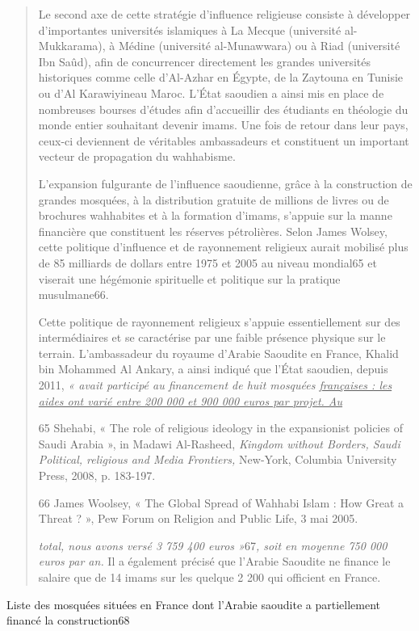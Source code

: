 \begin{quote}
Le second axe de cette stratégie d'influence religieuse consiste à
développer d'importantes universités islamiques à La Mecque (université
al-Mukkarama), à Médine (université al-Munawwara) ou à Riad (université
Ibn Saûd), afin de concurrencer directement les grandes universités
historiques comme celle d'Al-Azhar en Égypte, de la Zaytouna en Tunisie
ou d'Al Karawiyineau Maroc. L'État saoudien a ainsi mis en place de
nombreuses bourses d'études afin d'accueillir des étudiants en théologie
du monde entier souhaitant devenir imams. Une fois de retour dans leur
pays, ceux-ci deviennent de véritables ambassadeurs et constituent un
important vecteur de propagation du wahhabisme.

L'expansion fulgurante de l'influence saoudienne, grâce à la
construction de grandes mosquées, à la distribution gratuite de millions
de livres ou de brochures wahhabites et à la formation d'imams, s'appuie
sur la manne financière que constituent les réserves pétrolières. Selon
James Wolsey, cette politique d'influence et de rayonnement religieux
aurait mobilisé plus de 85 milliards de dollars entre 1975 et 2005 au
niveau mondial65 et viserait une hégémonie spirituelle et politique sur
la pratique musulmane66.

Cette politique de rayonnement religieux s'appuie essentiellement sur
des intermédiaires et se caractérise par une faible présence physique
sur le terrain. L'ambassadeur du royaume d'Arabie Saoudite en France,
Khalid bin Mohammed Al Ankary, a ainsi indiqué que l'État saoudien,
depuis 2011, \emph{« avait participé au financement de huit mosquées
\underline{françaises : les aides ont varié entre 200 000 et 900 000
euros par projet. Au}}

65 Shehabi, « The role of religious ideology in the expansionist
policies of Saudi Arabia », in Madawi Al-Rasheed, \emph{Kingdom without
Borders, Saudi Political, religious and Media Frontiers,} New-York,
Columbia University Press, 2008, p. 183-197.

66 James Woolsey, « The Global Spread of Wahhabi Islam : How Great a
Threat ? », Pew Forum on Religion and Public Life, 3 mai 2005.



\emph{total, nous avons versé 3 759 400 euros »}67\emph{, soit en
moyenne 750 000 euros par an.} Il a également précisé que l'Arabie
Saoudite ne finance le salaire que de 14 imams sur les quelque 2 200 qui
officient en France.
\end{quote}

Liste des mosquées situées en France dont l'Arabie saoudite a
partiellement financé la construction68

